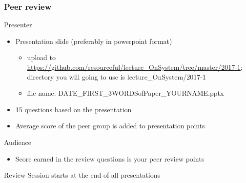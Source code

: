 \documentclass[newPxFont,sthlmFooter,nooffset]{beamer}
\begin{document}
\begin{frame}
  \frametitle{Peer review}

Presenter 
\begin{itemize}
\item Presentation slide (preferably in powerpoint format)
  \begin{itemize}
  \item upload to \url{https://github.com/resourceful/lecture_OnSystem/tree/master/2017-1};  directory you will going to use is lecture\_OnSystem/2017-1
  \item file name: DATE\_FIRST\_3WORDSofPaper\_YOURNAME.pptx
  \end{itemize}
\item 15 questions based on the presentation
\item Average score of the peer group is added to presentation points
\end{itemize}

Audience
\begin{itemize}
\item Score earned in the review questions is your peer review points
\end{itemize}

Review Session starts at the end of all presentations
\end{frame}
\end{document}
